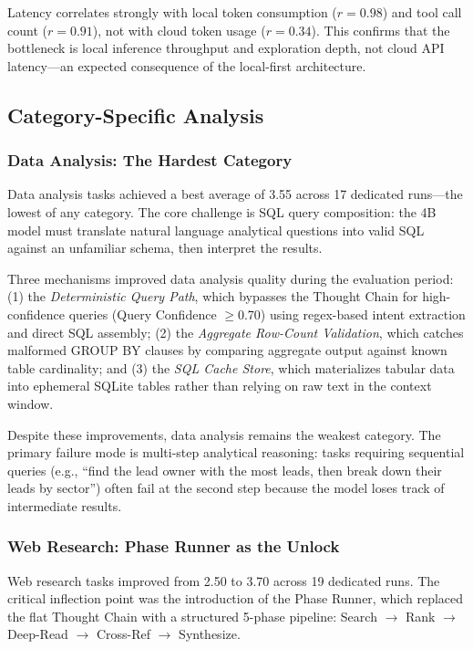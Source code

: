 \documentclass{article}
\begin{document}
Latency correlates strongly with local token consumption ($r = 0.98$) and tool call count ($r = 0.91$), not with cloud token usage ($r = 0.34$).
This confirms that the bottleneck is local inference throughput and exploration depth, not cloud API latency---an expected consequence of the local-first architecture.

\subsection{Category-Specific Analysis}
\label{sec:eval_category_deep}

\subsubsection{Data Analysis: The Hardest Category}

Data analysis tasks achieved a best average of 3.55 across 17 dedicated runs---the lowest of any category.
The core challenge is SQL query composition: the 4B model must translate natural language analytical questions into valid SQL against an unfamiliar schema, then interpret the results.

Three mechanisms improved data analysis quality during the evaluation period:
(1) the \emph{Deterministic Query Path}, which bypasses the Thought Chain for high-confidence queries (Query Confidence $\geq$0.70) using regex-based intent extraction and direct SQL assembly;
(2) the \emph{Aggregate Row-Count Validation}, which catches malformed GROUP BY clauses by comparing aggregate output against known table cardinality;
and (3) the \emph{SQL Cache Store}, which materializes tabular data into ephemeral SQLite tables rather than relying on raw text in the context window.

Despite these improvements, data analysis remains the weakest category.
The primary failure mode is multi-step analytical reasoning: tasks requiring sequential queries (e.g., ``find the lead owner with the most leads, then break down their leads by sector'') often fail at the second step because the model loses track of intermediate results.

\subsubsection{Web Research: Phase Runner as the Unlock}

Web research tasks improved from 2.50 to 3.70 across 19 dedicated runs.
The critical inflection point was the introduction of the Phase Runner, which replaced the flat Thought Chain with a structured 5-phase pipeline: Search $\to$ Rank $\to$ Deep-Read $\to$ Cross-Ref $\to$ Synthesize.
\end{document}
